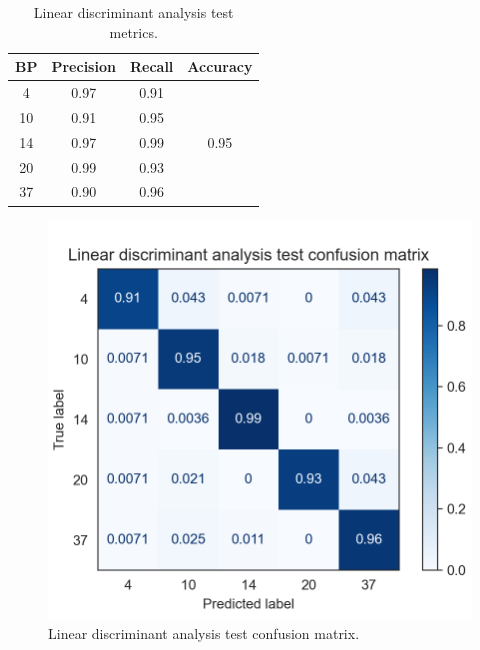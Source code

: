 \documentclass[twocolumn]{article}
\begin{document}
                  \begin{table}[H]
                        \centering
                        \caption{Linear discriminant analysis test metrics.}
                        \label{tab:lda}
                        \begin{tabular}{c|cc|c}
                        BP & Precision & Recall & Accuracy              \\ \hline
                        4  & 0.97      & 0.91   & \multirow{5}{*}{0.95} \\
                        10 & 0.91      & 0.95   &                       \\
                        14 & 0.97      & 0.99   &                       \\
                        20 & 0.99      & 0.93   &                       \\
                        37 & 0.90      & 0.96   &                      
                        \end{tabular}
                  \end{table}

                  \begin{figure}[H]
                        \includegraphics[width=\linewidth]{lda.png}
                        \caption{Linear discriminant analysis test confusion matrix.}
                        \label{fig:lda}
                  \end{figure}
\end{document}
